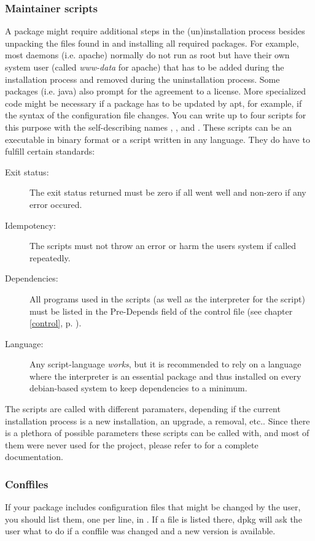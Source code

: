 \subsubsection{Maintainer scripts}
A package might require additional steps in the (un)installation process besides
unpacking the files found in  and installing all required
packages. For example, most daemons (i.e. apache) normally do not
run as root but have their own system user (called \emph{www-data} for apache)
that has to be added during the installation process and removed during the
uninstallation process. Some packages (i.e. java) also prompt for the agreement
to a license. More specialized code might be necessary if a package has to be
updated by apt, for example, if the syntax of the configuration file changes.
You can write up to four scripts for this purpose with the self-describing names
, ,  and . These scripts can
be an executable in binary format or a script written in any language. They do
have to fulfill certain standards:
\begin{description}
  \item[Exit status:] The exit status returned must be zero if all went well and
    non-zero if any error occured.
  \item[Idempotency:] The scripts must not throw an error or harm the users
    system if called repeatedly. 
  \item[Dependencies:] All programs used in the scripts (as well as the
    interpreter for the script) must be listed in the Pre-Depends field of the
    control file (see chapter \ref{control}, p. \pageref{control}).
  \item[Language:] Any script-language \emph{works}, but it is recommended to
    rely on a language where the interpreter is an essential package and thus
    installed on every debian-based system to keep dependencies to a minimum.
\end{description}
The scripts are called with different paramaters, depending if the current
installation process is a new installation, an upgrade, a removal, etc..
Since there is a plethora of possible parameters these scripts can be called
with, and most of them were never used for the \tunix project, please refer to
\cite{debian policy manual} for a complete documentation.

\subsubsection{Conffiles}
If your package includes configuration files that might be changed by the user,
you should list them, one per line, in . If a file
is listed there, dpkg will ask the user what to do if a conffile was changed and
a new version is available. 

